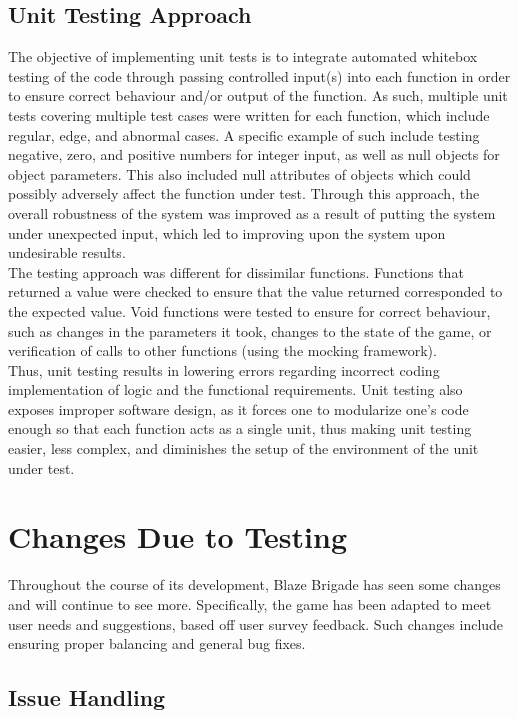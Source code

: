 \documentclass{article}
\begin{document}
\subsection{Unit Testing Approach}

The objective of implementing unit tests is to integrate automated whitebox testing of the code through passing controlled input(s) into each function in order to ensure correct behaviour and/or output of the function. As such, multiple unit tests covering multiple test cases were written for each function, which include regular, edge, and abnormal cases. A specific example of such include testing negative, zero, and positive numbers for integer input, as well as null objects for object parameters. This also included null attributes of objects which could possibly adversely affect the function under test. Through this approach, the overall robustness of the system was improved as a result of putting the system under unexpected input, which led to improving upon the system upon undesirable results. \\

The testing approach was different for dissimilar functions. Functions that returned a value were checked to ensure that the value returned corresponded to the expected value. Void functions were tested to ensure for correct behaviour, such as changes in the parameters it took, changes to the state of the game, or verification of calls to other functions (using the mocking framework). \\

Thus, unit testing results in lowering errors regarding incorrect coding implementation of logic and the functional requirements. Unit testing also exposes improper software design, as it forces one to modularize one's code enough so that each function acts as a single unit, thus making unit testing easier, less complex, and diminishes the setup of the environment of the unit under test.

\section{Changes Due to Testing}

Throughout the course of its development, Blaze Brigade has seen some changes and will continue to see more. Specifically, the game has been adapted to meet user needs and suggestions, based off user survey feedback. Such changes include ensuring proper balancing and general bug fixes.

\subsection{Issue Handling}
\end{document}
